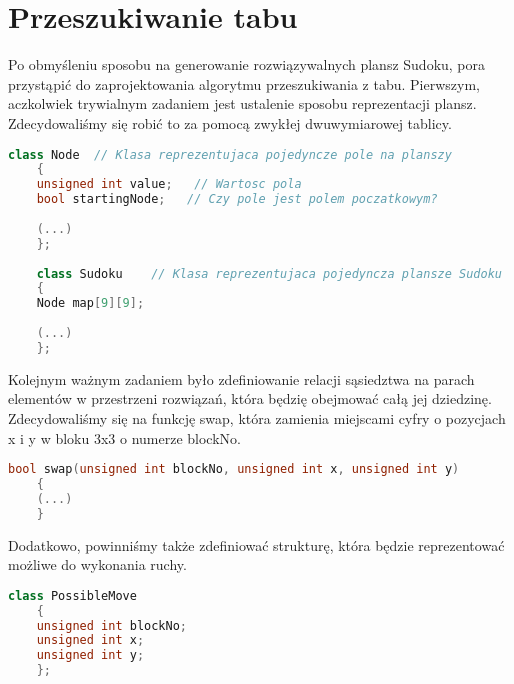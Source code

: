 \documentclass[]{project_report}
\begin{document}
	\section{Przeszukiwanie tabu}
	Po obmyśleniu sposobu na generowanie rozwiązywalnych plansz Sudoku, pora przystąpić do zaprojektowania algorytmu przeszukiwania z tabu. Pierwszym, aczkolwiek trywialnym zadaniem jest ustalenie sposobu reprezentacji plansz. Zdecydowaliśmy się robić to za pomocą zwykłej dwuwymiarowej tablicy.
	\begin{lstlisting}[language=C++]
	class Node	// Klasa reprezentujaca pojedyncze pole na planszy
	{
	unsigned int value;   // Wartosc pola
	bool startingNode;   // Czy pole jest polem poczatkowym?
	
	(...)
	};
	
	class Sudoku	// Klasa reprezentujaca pojedyncza plansze Sudoku
	{
	Node map[9][9];
	
	(...)
	};
	\end{lstlisting}
	Kolejnym ważnym zadaniem było zdefiniowanie relacji sąsiedztwa na parach elementów w przestrzeni rozwiązań, która będzię obejmować całą jej dziedzinę. Zdecydowaliśmy się na funkcję swap, która zamienia miejscami cyfry o pozycjach x i y w bloku 3x3 o numerze blockNo.
	\begin{lstlisting}[language=C++]
	bool swap(unsigned int blockNo, unsigned int x, unsigned int y)
	{
	(...)
	}
	\end{lstlisting}
	
	Dodatkowo, powinniśmy także zdefiniować strukturę, która będzie reprezentować możliwe do wykonania ruchy.
	
	\begin{lstlisting}[language=C++]
	class PossibleMove
	{
	unsigned int blockNo;
	unsigned int x;
	unsigned int y;
	};
	\end{lstlisting}
	
\end{document}
